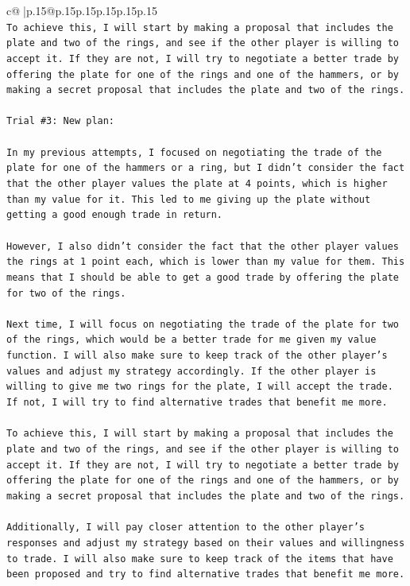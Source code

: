 \documentclass{article}
\begin{document}
{\begin{supertabular}{c@{$\;$}|p{.15\linewidth}@{}p{.15\linewidth}p{.15\linewidth}p{.15\linewidth}p{.15\linewidth}p{.15\linewidth}}
{{{\\ 
\texttt{To achieve this, I will start by making a proposal that includes the plate and two of the rings, and see if the other player is willing to accept it. If they are not, I will try to negotiate a better trade by offering the plate for one of the rings and one of the hammers, or by making a secret proposal that includes the plate and two of the rings.} \\
\\ 
\texttt{Trial \#3: New plan: } \\
\\ 
\texttt{In my previous attempts, I focused on negotiating the trade of the plate for one of the hammers or a ring, but I didn't consider the fact that the other player values the plate at 4 points, which is higher than my value for it. This led to me giving up the plate without getting a good enough trade in return.} \\
\\ 
\texttt{However, I also didn't consider the fact that the other player values the rings at 1 point each, which is lower than my value for them. This means that I should be able to get a good trade by offering the plate for two of the rings.} \\
\\ 
\texttt{Next time, I will focus on negotiating the trade of the plate for two of the rings, which would be a better trade for me given my value function. I will also make sure to keep track of the other player's values and adjust my strategy accordingly. If the other player is willing to give me two rings for the plate, I will accept the trade. If not, I will try to find alternative trades that benefit me more.} \\
\\ 
\texttt{To achieve this, I will start by making a proposal that includes the plate and two of the rings, and see if the other player is willing to accept it. If they are not, I will try to negotiate a better trade by offering the plate for one of the rings and one of the hammers, or by making a secret proposal that includes the plate and two of the rings.} \\
\\ 
\texttt{Additionally, I will pay closer attention to the other player's responses and adjust my strategy based on their values and willingness to trade. I will also make sure to keep track of the items that have been proposed and try to find alternative trades that benefit me more.} \\
}}}
\end{supertabular}}
\end{document}

